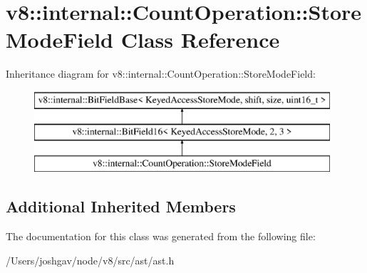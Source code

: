 \hypertarget{classv8_1_1internal_1_1_count_operation_1_1_store_mode_field}{}\section{v8\+:\+:internal\+:\+:Count\+Operation\+:\+:Store\+Mode\+Field Class Reference}
\label{classv8_1_1internal_1_1_count_operation_1_1_store_mode_field}
Inheritance diagram for v8\+:\+:internal\+:\+:Count\+Operation\+:\+:Store\+Mode\+Field\+:\begin{figure}[H]
\begin{center}
\leavevmode
\includegraphics[height=3.000000cm]{classv8_1_1internal_1_1_count_operation_1_1_store_mode_field}
\end{center}
\end{figure}
\subsection*{Additional Inherited Members}


The documentation for this class was generated from the following file\+:\begin{DoxyCompactItemize}
\item 
/\+Users/joshgav/node/v8/src/ast/ast.\+h\end{DoxyCompactItemize}
